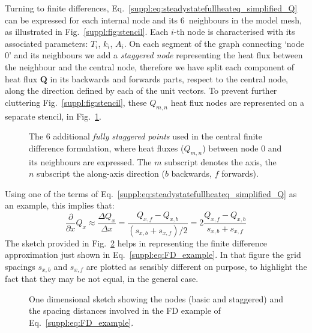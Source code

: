 Turning to finite differences, Eq.~\ref{suppl:eq:steadystatefullheateq_simplified_Q} can be expressed for each internal node and its 6~neighbours in the model mesh, as illustrated in Fig.~\ref{suppl:fig:stencil}.
Each $i$-th node is characterised with its associated parameters: $T_i$, $k_i$, $A_i$.
On each segment of the graph connecting `node $0$' and its neighbours we add a \textit{staggered node} representing the heat flux between the neighbour and the central node, therefore we have split each component of heat flux $\bm{Q}$ in its backwards and forwards parts, respect to the central node, along the direction defined by each of the unit vectors.
To prevent further cluttering Fig.~\ref{suppl:fig:stencil}, these $Q_{m,n}$ heat flux nodes are represented on a separate stencil, in Fig.~\ref{suppl:fig:stencil_staggered}.

\begin{figure}[ht] %
    \begin{adjustbox}{center}
    \end{adjustbox}
    \caption[Additional (staggered) points used in the central finite difference formulation.]{The 6 additional \textit{fully staggered points} used in the central finite difference formulation, where heat fluxes ($Q_{m,n}$) between node $0$ and its neighbours are expressed.
    The $m$ subscript denotes the axis, the $n$ subscript the along-axis direction ($b$ backwards, $f$ forwards).}
    \label{suppl:fig:stencil_staggered}
\end{figure}

Using one of the terms of Eq.~\ref{suppl:eq:steadystatefullheateq_simplified_Q} as an example, this implies that:
\begin{equation}
    \label{suppl:eq:FD_example}
    \frac{\partial}{\partial x} Q_x \approx
    \frac{\Delta Q_x}{\Delta x} =
    \frac{Q_{x,f} - Q_{x,b}}{(s_{x,b} + s_{x,f}) / 2} =
    2 \frac{Q_{x,f} - Q_{x,b}}{s_{x,b} + s_{x,f}}
\end{equation}
The sketch provided in Fig.~\ref{suppl:fig:stencil_sketch} helps in representing the finite difference approximation just shown in Eq.~\ref{suppl:eq:FD_example}.
In that figure the grid spacings $s_{x,b}$ and $s_{x,f}$ are plotted as sensibly different on purpose, to highlight the fact that they may be not equal, in the general case.

\begin{figure}[ht] %
    \begin{adjustbox}{center}
    \end{adjustbox}
    \caption[Finite differences around one node, one dimensional sketch.]{One dimensional sketch showing the nodes (basic and staggered) and the spacing distances involved in the FD example of Eq.~\ref{suppl:eq:FD_example}.}
    \label{suppl:fig:stencil_sketch}
\end{figure}

